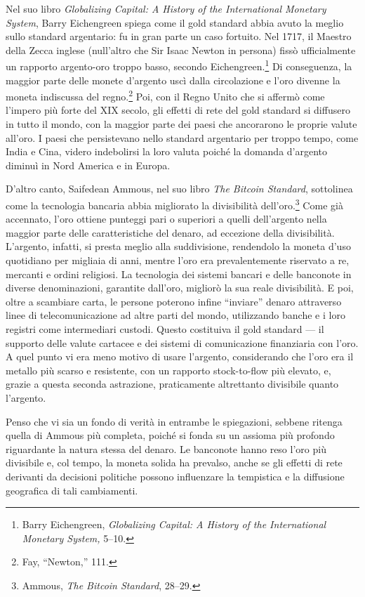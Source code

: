 \documentclass[
  a5paper,
  smalldemyvopaper,10pt,twoside,onecolumn,openright,extrafontsizes,hidelinks]{memoir}
\begin{document}
Nel suo libro \emph{Globalizing Capital: A History of the International
Monetary System}, Barry Eichengreen spiega come il gold standard abbia
avuto la meglio sullo standard argentario: fu in gran parte un caso
fortuito. Nel 1717, il Maestro della Zecca inglese (null'altro che Sir
Isaac Newton in persona) fissò ufficialmente un rapporto argento-oro
troppo basso, secondo Eichengreen.\footnote{Barry Eichengreen,
  \emph{Globalizing Capital: A History of the International Monetary
  System,} 5--10.} Di conseguenza, la maggior parte delle monete
d'argento uscì dalla circolazione e l'oro divenne la moneta indiscussa
del regno.\footnote{Fay, ``Newton,'' 111.} Poi, con il Regno Unito che
si affermò come l'impero più forte del XIX secolo, gli effetti di rete
del gold standard si diffusero in tutto il mondo, con la maggior parte
dei paesi che ancorarono le proprie valute all'oro. I paesi che
persistevano nello standard argentario per troppo tempo, come India e
Cina, videro indebolirsi la loro valuta poiché la domanda d'argento
diminuì in Nord America e in Europa.

D'altro canto, Saifedean Ammous, nel suo libro \emph{The Bitcoin
Standard}, sottolinea come la tecnologia bancaria abbia migliorato la
divisibilità dell'oro.\footnote{Ammous, \emph{The Bitcoin Standard},
  28--29.} Come già accennato, l'oro ottiene punteggi pari o superiori a
quelli dell'argento nella maggior parte delle caratteristiche del
denaro, ad eccezione della divisibilità. L'argento, infatti, si presta
meglio alla suddivisione, rendendolo la moneta d'uso quotidiano per
migliaia di anni, mentre l'oro era prevalentemente riservato a re,
mercanti e ordini religiosi. La tecnologia dei sistemi bancari e delle
banconote in diverse denominazioni, garantite dall'oro, migliorò la sua
reale divisibilità. E poi, oltre a scambiare carta, le persone poterono
infine ``inviare'' denaro attraverso linee di telecomunicazione ad altre
parti del mondo, utilizzando banche e i loro registri come intermediari
custodi. Questo costituiva il gold standard --- il supporto delle valute
cartacee e dei sistemi di comunicazione finanziaria con l'oro. A quel
punto vi era meno motivo di usare l'argento, considerando che l'oro era
il metallo più scarso e resistente, con un rapporto stock-to-flow più
elevato, e, grazie a questa seconda astrazione, praticamente altrettanto
divisibile quanto l'argento.

Penso che vi sia un fondo di verità in entrambe le spiegazioni, sebbene
ritenga quella di Ammous più completa, poiché si fonda su un assioma più
profondo riguardante la natura stessa del denaro. Le banconote hanno
reso l'oro più divisibile e, col tempo, la moneta solida ha prevalso,
anche se gli effetti di rete derivanti da decisioni politiche possono
influenzare la tempistica e la diffusione geografica di tali
cambiamenti.
\end{document}

